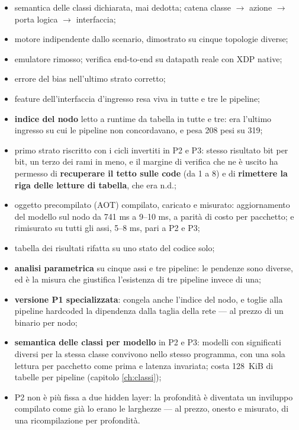 \documentclass[11pt,a4paper,oneside]{report}
\begin{document}
\begin{itemize}
\item semantica delle classi dichiarata, mai dedotta; catena classe $\to$ azione
      $\to$ porta logica $\to$ interfaccia;
\item motore indipendente dallo scenario, dimostrato su cinque topologie diverse;
\item emulatore rimosso; verifica end-to-end su datapath reale con XDP native;
\item errore del bias nell'ultimo strato corretto;
\item feature dell'interfaccia d'ingresso resa viva in tutte e tre le pipeline;
\item \textbf{indice del nodo} letto a runtime da tabella in tutte e tre: era
      l'ultimo ingresso su cui le pipeline non concordavano, e pesa 208 pesi su
      319;
\item primo strato riscritto con i cicli invertiti in P2 e P3: stesso risultato
      bit per bit, un terzo dei rami in meno, e il margine di verifica che ne è
      uscito ha permesso di \textbf{recuperare il tetto sulle code} (da 1 a 8) e
      di \textbf{rimettere la riga delle letture di tabella}, che era n.d.;
\item oggetto precompilato (AOT) compilato, caricato e misurato: aggiornamento
      del modello sul nodo da 741 ms a 9--10 ms, a parità di costo per
      pacchetto; e rimisurato su tutti gli assi, 5--8 ms, pari a P2 e P3;
\item tabella dei risultati rifatta su uno stato del codice solo;
\item \textbf{analisi parametrica} su cinque assi e tre pipeline: le pendenze
      sono diverse, ed è la misura che giustifica l'esistenza di tre pipeline
      invece di una;
\item \textbf{versione P1 specializzata}: congela anche l'indice del nodo, e
      toglie alla pipeline hardcoded la dipendenza dalla taglia della rete ---
      al prezzo di un binario per nodo;
\item \textbf{semantica delle classi per modello} in P2 e P3: modelli con
      significati diversi per la stessa classe convivono nello stesso programma,
      con una sola lettura per pacchetto come prima e latenza invariata; costa
      128~KiB di tabelle per pipeline (capitolo \ref{ch:classi});
\item P2 non è più fissa a due hidden layer: la profondità è diventata un
      inviluppo compilato come già lo erano le larghezze --- al prezzo, onesto e
      misurato, di una ricompilazione per profondità.

\end{itemize}
\end{document}
